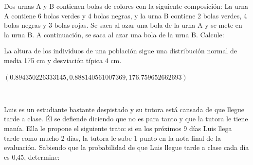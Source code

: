 \documentclass[addpoints,spanish, 12pt,a4paper]{exam}
\begin{document}
\begin{questions}


\question Dos urnas A y B contienen bolas de colores con la siguiente composición: La urna
A contiene 6 bolas verdes y 4 bolas negras, y la urna B contiene 2 bolas verdes, 4
bolas negras y 3 bolas rojas. Se saca al azar una bola de la urna A y se mete en la
urna B. A continuación, se saca al azar una bola de la urna B. Calcule:


\question La altura de los individuos de una población sigue una distribución normal de media
175 cm y desviación típica 4 cm.
\begin{solution}
$(0.894350226333145, 0.888140561007369, 176.759652662693)$
\end{solution}
\

\question Luis es un estudiante bastante despistado y su tutora está cansada de que llegue
tarde a clase. Él se defiende diciendo que no es para tanto y que la tutora le tiene
manía. Ella le propone el siguiente trato: si en los próximos 9 días Luis llega tarde como mucho 2 días, la tutora le sube 1 punto en la nota final de la evaluación.
Sabiendo que la probabilidad de que Luis llegue tarde a clase cada día es 0,45,
determine:
\begin{parts}

\end{parts}
\end{questions}
\end{document}
